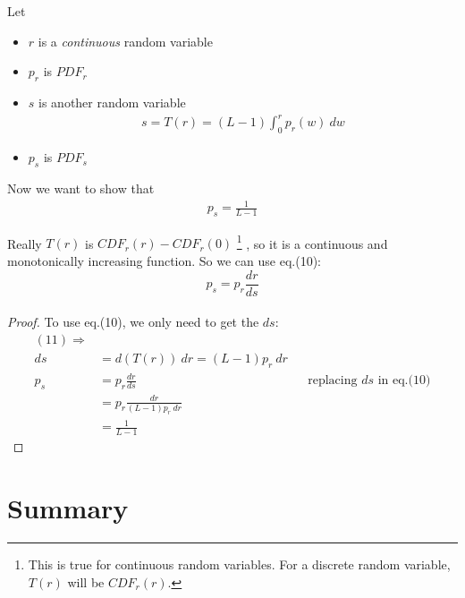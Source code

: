 \documentclass[a4paper]{article}
\begin{document}
\pagebreak

\section*{}

\paragraph*{}
Let 
\begin{itemize}
    \item $r$ is a \emph{continuous} random variable
    \item $p_r$ is $PDF_r$
    \item $s$ is another random variable
        \begin{align}
            s =T(r) = (L-1) \int_{0}^{r} p_r(w) \ dw
        \end{align}
    \item $p_s$ is $PDF_s$
\end{itemize}

Now we want to show that 
\begin{align*}
    p_s = \frac{1}{L-1}
\end{align*}

Really $T(r)$ is $CDF_r(r) - CDF_r(0)$
\footnote{This is true for continuous random variables. For a discrete random variable, $T(r)$ will be $CDF_r(r)$.}
, so it is a continuous and monotonically increasing function. So we can use
eq.(10): 
\[ p_s = p_r \frac{dr}{ds} \]

\paragraph*{}


\begin{proof}
    To use eq.(10), we only need to get the $ds$:
    \begin{align*}
        (11) \Rightarrow\\ 
        ds &= d(T(r)) \ dr = (L-1) p_r \  dr\\
        p_s &= p_r \frac{dr}{ds} && \text{replacing $ds$ in eq.(10)}\\
        &=p_r \frac{dr}{(L-1) p_r \  dr}\\
        &=\frac{1}{L-1}
    \end{align*}
\end{proof}

\pagebreak

\section{Summary}
\end{document}
